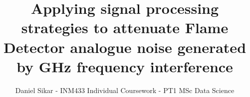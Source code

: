 \title{Applying signal processing strategies to attenuate Flame Detector analogue noise generated by GHz frequency interference}


\author{Daniel Sikar - INM433 Individual Coursework - PT1 MSc Data Science}
